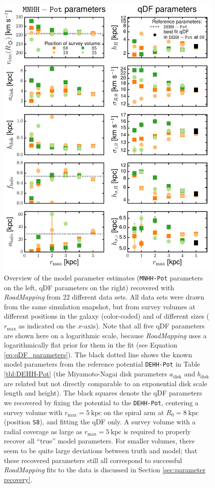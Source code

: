 \documentclass[iop,revtex4,numberedappendix,appendixfloats]{emulateapj}
\newcommand{\RM}{{\sl RoadMapping}}
\begin{document}
\begin{figure}[!htbp]
\centering
\includegraphics[width=\columnwidth]{fig/MNdHHdiffSph2_violins_3.pdf}
\caption{Overview of the model parameter estimates (\texttt{MNHH-Pot} parameters on the left, qDF parameters on the right) recovered with \RM{} from 22 different data sets. All data sets were drawn from the same simulation snapshot, but from survey volumes at different positions in the galaxy (color-coded) and of different sizes ($r_\text{max}$ as indicated on the $x$-axis). Note that all five qDF parameters are shown here on a logarithmic scale, because \RM{} uses a logarithmically flat prior for them in the fit (see Equation \eqref{eq:qDF_parameters}). The black dotted line shows the known model parameters from the reference potential \texttt{DEHH-Pot} in Table \ref{tbl:DEHH-Pot} (the Miyamoto-Nagai disk parameters $a_\text{disk}$ and $b_\text{disk}$ are related but not directly comparable to an exponential disk scale length and height). The black squares denote the qDF parameters we recovered by fixing the potential to the \texttt{DEHH-Pot}, centering a survey volume with $r_\text{max}=5~\text{kpc}$ on the spiral arm at $R_0=8~\text{kpc}$ (position \texttt{S8}), and fitting the qDF only. A survey volume with a radial coverage as large as $r_\text{max}=5~\text{kpc}$ is required to properly recover all ``true'' model parameters. For smaller volumes, there seem to be quite large deviations between truth and model; that these recovered parameters still all correspond to successful \RM{} fits to the data is discussed in Section \ref{sec:parameter recovery}.}
\label{fig:model_parameters}
\end{figure}
\end{document}
